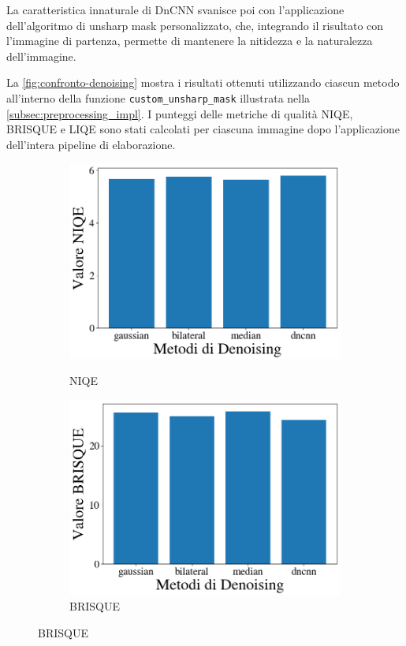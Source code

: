 La caratteristica innaturale di DnCNN svanisce poi con l'applicazione dell'algoritmo di unsharp mask personalizzato, che, integrando il risultato con l'immagine di partenza, permette di mantenere la nitidezza e la naturalezza dell'immagine.

La \cref{fig:confronto-denoising} mostra i risultati ottenuti utilizzando ciascun metodo all'interno della funzione \texttt{custom\_unsharp\_mask} illustrata nella \cref{subsec:preprocessing_impl}. I punteggi delle metriche di qualità NIQE, BRISQUE e LIQE sono stati calcolati per ciascuna immagine dopo l'applicazione dell'intera pipeline di elaborazione.

\begin{figure}[H]
    \centering
    \begin{subfigure}[t]{0.32\textwidth}
        \centering
        \caption{NIQE}
        \includegraphics[width=\linewidth]{../assets/denoising_comparison_NIQE.png}
        \label{fig:den_niqe}
    \end{subfigure}
    \hfill
    \begin{subfigure}[t]{0.32\textwidth}
        \centering
        \caption{BRISQUE}
        \includegraphics[width=\linewidth]{../assets/denoising_comparison_BRISQUE.png}

\end{subfigure}
\end{figure}
